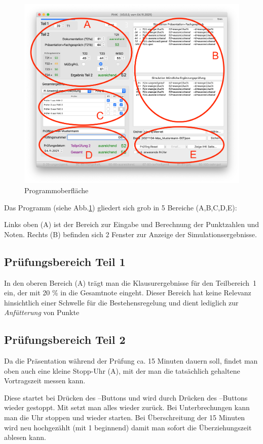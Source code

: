 \documentclass[a4paper,notitlepage,parskip=half]{scrartcl}
\begin{document}
\begin{figure}[ht]
	\centering
    \includegraphics[width=\textwidth]{Hauptfenster.png}
	\caption{Programmoberfläche}
	\label{fig:pihk}
\end{figure}

Das Programm (siehe Abb.\ref{fig:pihk}) gliedert sich grob in 5 Bereiche (A,B,C,D,E):

Links oben (A) ist der Bereich zur Eingabe und Berechnung der Punktzahlen und Noten. Rechts (B) befinden sich 2 Fenster zur Anzeige der Simulationsergebnisse.

\subsection{Prüfungsbereich Teil 1}
In den oberen Bereich (A) trägt man die Klausurergebnisse für den Teilbereich~1 ein, der mit 20 \% in die Gesamtnote eingeht.
Dieser Bereich hat keine Relevanz hinsichtlich einer Schwelle für die Bestehensregelung und dient lediglich zur \emph{Anfütterung} von Punkte

\subsection{Prüfungsbereich Teil 2} 
Da die Präsentation während der Prüfung ca. 15 Minuten dauern soll, findet man oben auch eine kleine Stopp-Uhr (A), mit der man die tatsächlich gehaltene Vortragszeit messen kann.

Diese startet bei Drücken des --Buttons und wird durch Drücken des --Buttons wieder gestoppt. 
Mit  setzt man alles wieder zurück.
Bei Unterbrechungen kann man die Uhr stoppen und wieder starten.
Bei Überschreitung der 15 Minuten wird neu hochgezählt (mit 1 beginnend) damit man sofort die Überziehungszeit ablesen kann.
\end{document}
